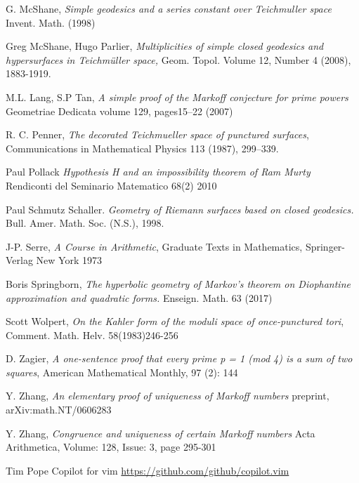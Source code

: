 \documentclass[12pt,a4paper]{amsart}
\begin{document}
G. McShane,
\textit{Simple geodesics and a series constant over Teichmuller space}
Invent. Math. (1998)

Greg McShane, Hugo Parlier,
\textit{Multiplicities of simple closed geodesics and hypersurfaces in Teichmüller space,}
Geom. Topol.
Volume 12, Number 4 (2008), 1883-1919.

M.L. Lang, S.P Tan,
\textit{A simple proof of the Markoff conjecture for prime powers}
Geometriae Dedicata volume 129, pages15–22 (2007)

R. C. Penner, 
\textit{The decorated Teichmueller space of punctured surfaces}, 
Communications in Mathematical Physics 113 (1987), 299–339.

Paul Pollack
\textit{ Hypothesis H and an impossibility theorem of Ram Murty }
Rendiconti del Seminario Matematico 68(2) 2010

 Paul Schmutz Schaller. 
 \textit{Geometry of Riemann surfaces based on closed geodesics.}
 Bull. Amer. Math. Soc. (N.S.),  1998.

J-P. Serre,
\textit{A Course in Arithmetic},
Graduate Texts in Mathematics,
Springer-Verlag New York
1973

Boris Springborn, 
\textit{The hyperbolic geometry of Markov’s theorem on Diophantine
approximation and quadratic forms.} Enseign. Math. 63 (2017)

Scott Wolpert,
\textit{On the Kahler form of the moduli space of once-punctured tori}, 
Comment. Math. Helv. 58(1983)246-256

D. Zagier,
 \textit{A one-sentence proof that every prime p = 1 (mod 4) is a sum of two squares}, 
 American Mathematical Monthly, 97 (2): 144
 
 Y. Zhang,
 \textit{ An elementary proof of uniqueness of Markoff numbers}
 preprint, arXiv:math.NT/0606283
 
   Y. Zhang,
 \textit{Congruence and uniqueness of certain Markoff numbers}
 Acta Arithmetica, Volume: 128, Issue: 3, page 295-301


  Tim Pope Copilot for vim
   \url{https://github.com/github/copilot.vim}

%

%
%
%
%
%
%
%
\end{document}

